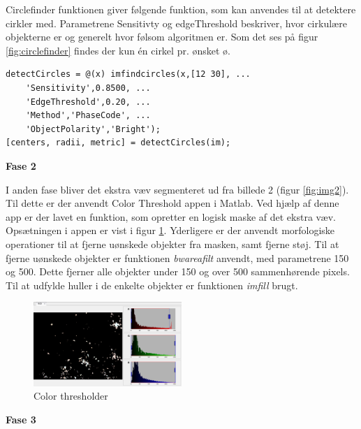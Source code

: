 Circlefinder funktionen giver følgende funktion, som kan anvendes til at detektere cirkler med. Parametrene Sensitivty og edgeThreshold beskriver, hvor cirkulære objekterne er og generelt hvor følsom algoritmen er. Som det ses på figur \ref{fig:circlefinder} findes der kun én cirkel pr. ønsket ø.
\begin{lstlisting} 
detectCircles = @(x) imfindcircles(x,[12 30], ...
	'Sensitivity',0.8500, ...
	'EdgeThreshold',0.20, ...
	'Method','PhaseCode', ...
	'ObjectPolarity','Bright');
[centers, radii, metric] = detectCircles(im);
\end{lstlisting} 


\textbf{Fase 2}

I anden fase bliver det ekstra væv segmenteret ud fra billede 2 (figur \ref{fig:img2}). Til dette er der anvendt Color Threshold appen i Matlab. Ved hjælp af denne app er der lavet en funktion, som opretter en logisk maske af det ekstra væv. Opsætningen i appen er vist i figur \ref{fig:colorthres}. Yderligere er der anvendt morfologiske operationer til at fjerne uønskede objekter fra masken, samt fjerne støj. Til at fjerne uønskede objekter er funktionen \textit{bwareafilt} anvendt, med parametrene 150 og 500. Dette fjerner alle objekter under 150 og over 500 sammenhørende pixels. Til at udfylde huller i de enkelte objekter er funktionen \textit{imfill} brugt. 
 \begin{figure}[H]
	\centering
	\includegraphics[width=0.5\textwidth]{billeder/software/face2.png}
	\caption{Color thresholder}
	\label{fig:colorthres}
\end{figure}
\textbf{Fase 3}

